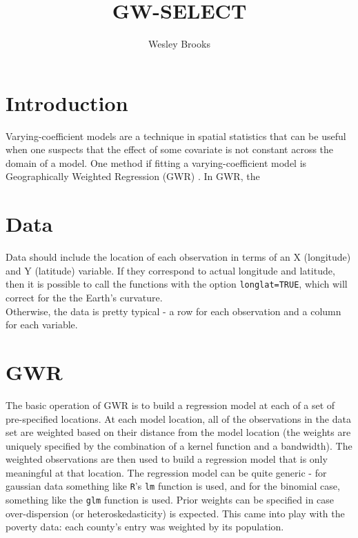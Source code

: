 \documentclass[10pt]{amsart}
\title{GW-SELECT}
\author{Wesley Brooks}
\date{}                                           %
\begin{document}
\maketitle





\section{Introduction}
Varying-coefficient models are a technique in spatial statistics that can be useful when one suspects that the effect of some covariate is not constant across the domain of a model. One method if fitting a varying-coefficient model is Geographically Weighted Regression (GWR) \cite{Fotheringham:2002}. In GWR, the 

\section{Data}
Data should include the location of each observation in terms of an X (longitude) and Y (latitude) variable. If they correspond to actual longitude and latitude, then it is possible to call the functions with the option \verb!longlat=TRUE!, which will correct for the the Earth's curvature.\\

Otherwise, the data is pretty typical - a row for each observation and a column for each variable.\\

\section{GWR}
The basic operation of GWR is to build a regression model at each of a set of pre-specified locations. At each model location, all of the observations in the data set are weighted based on their distance from the model location (the weights are uniquely specified by the combination of a kernel function and a bandwidth). The weighted observations are then used to build a regression model that is only meaningful at that location. The regression model can be quite generic - for gaussian data something like \verb!R!'s \verb!lm! function is used, and for the binomial case, something like the \verb!glm! function is used. Prior weights can be specified in case over-dispersion (or heteroskedasticity) is expected. This came into play with the poverty data: each county's entry was weighted by its population.\\
\end{document}
